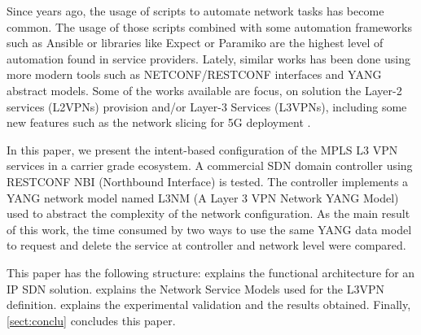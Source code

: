 \documentclass[conference]{IEEEtran}
\begin{document}
Since years ago, the usage of scripts to automate network tasks has become common. The usage of those scripts combined with some automation frameworks such as Ansible \cite{libes1995exploring} or libraries like Expect \cite{hochstein2017ansible} or Paramiko \cite{zadka2019paramiko} are the highest level of automation found in service providers. Lately, similar works has been done using more modern tools such as NETCONF/RESTCONF \cite{enns2011network,bierman2017RESTCONF,vilalta2018experimental} interfaces and YANG \cite{bjorklund2016yang} abstract models. Some of the works available are focus, on solution the  Layer-2 services (L2VPNs) provision \cite{ventre2017sdn,noghani2017automating,wuframework} and/or Layer-3 Services (L3VPNs), including some new features such as the network slicing for 5G deployment \cite{rokui2020standards}.



In this paper, we present the intent-based configuration of the MPLS L3 VPN services in a carrier grade ecosystem. A commercial SDN domain controller using RESTCONF NBI (Northbound Interface) is tested. The controller implements a YANG network model named L3NM (A Layer 3 VPN Network YANG Model) used to abstract the complexity of the network configuration.  As the main result of this work, the time consumed by two ways to use the same YANG data model to request and delete the service at controller and network level were compared.

This paper has the following structure:  explains the functional architecture for an IP SDN solution.  explains the Network Service Models used for the L3VPN definition.  explains the experimental validation and the results obtained. Finally, \cref{sect:conclu} concludes this paper. 
\end{document}
